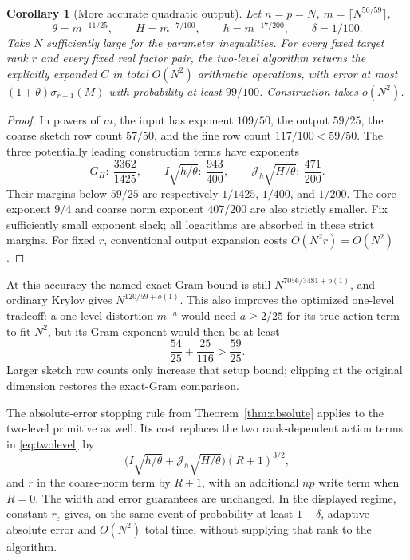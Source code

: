 \documentclass[11pt]{article}
\newtheorem{corollary}[theorem]{Corollary}
\begin{document}
\begin{corollary}[More accurate quadratic output]\label{cor:twolevel}
Let \(n=p=N\), \(m=\lceil N^{50/59}\rceil\),
\[
 \theta=m^{-11/25},\qquad H=m^{-7/100},\qquad
 h=m^{-17/200},\qquad\delta=1/100.
\]
Take \(N\) sufficiently large for the parameter inequalities.
For every fixed target rank \(r\) and every fixed real factor pair,
the two-level algorithm returns the explicitly expanded \(C\) in total
\(O(N^2)\) arithmetic operations, with error at most
\((1+\theta)\sigma_{r+1}(M)\) with probability at least \(99/100\).
Construction takes \(o(N^2)\).
\end{corollary}
\begin{proof}
In powers of \(m\), the input has exponent \(109/50\), the output
\(59/25\), the coarse sketch row count \(57/50\), and the fine row
count \(117/100<59/50\). The three potentially leading construction
terms have exponents
\[
 G_H:\ \frac{3362}{1425},\qquad
 I\sqrt{h/\theta}:\ \frac{943}{400},\qquad
 \mathcal J_h\sqrt{H/\theta}:\ \frac{471}{200}.
\]
Their margins below \(59/25\) are respectively \(1/1425\),
\(1/400\), and \(1/200\).
The core exponent \(9/4\) and coarse norm exponent \(407/200\)
are also strictly smaller. Fix sufficiently small exponent slack;
all logarithms are absorbed in these strict margins.
For fixed \(r\), conventional output expansion costs \(O(N^2r)=O(N^2)\).
\end{proof}

At this accuracy the named exact-Gram bound is still
\(N^{7056/3481+o(1)}\), and ordinary Krylov gives
\(N^{120/59+o(1)}\). This also improves the optimized one-level
tradeoff: a one-level distortion \(m^{-a}\) would need \(a\geq2/25\)
for its true-action term to fit \(N^2\), but its Gram exponent would
then be at least
\[
 \frac{54}{25}+\frac{25}{116}>
 \frac{59}{25}.
\]
Larger sketch row counts only increase that setup bound; clipping at
the original dimension restores the exact-Gram comparison.

The absolute-error stopping rule from Theorem~\ref{thm:absolute}
applies to the two-level primitive as well. Its cost replaces the
two rank-dependent action terms in \eqref{eq:twolevel} by
\[
 \bigl(I\sqrt{h/\theta}+\mathcal J_h\sqrt{H/\theta}\bigr)(R+1)^{3/2},
\]
and \(r\) in the coarse-norm term by \(R+1\), with an additional
\(np\) write term when \(R=0\). The width and error guarantees are
unchanged. In the displayed regime, constant \(r_\varepsilon\) gives,
on the same event of probability at least \(1-\delta\), adaptive
absolute error and \(O(N^2)\) total time, without supplying that rank
to the algorithm.
\end{document}
